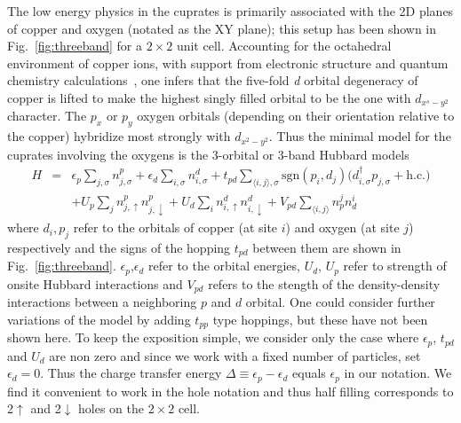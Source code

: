 The low energy physics in the cuprates is primarily associated with the 2D planes of copper and oxygen (notated 
as the XY plane); this setup has been shown in Fig.~\ref{fig:threeband} for a $2 \times 2$ unit cell.
Accounting for the octahedral environment of copper ions, with support from electronic structure 
and quantum chemistry calculations~\cite{Dagotto_sevModPhys}, one infers 
that the five-fold \emph{d} orbital degeneracy of copper is lifted to make the 
highest singly filled orbital to be the one with $d_{x^s-y^2}$ character. 
The $p_x$ or $p_y$ oxygen orbitals (depending on their orientation relative to the copper) 
hybridize most strongly with $d_{x^2-y^2}$. Thus the minimal model for the cuprates involving the oxygens 
is the 3-orbital or 3-band Hubbard models
\begin{eqnarray}
H &=&    \epsilon_p \sum_{j,\sigma} n^{p}_{j,\sigma} + \epsilon_{d} \sum_{i,\sigma}  n^{d}_{i,\sigma} 
	+ t_{pd} \sum_{\langle i,j \rangle, \sigma} \text{sgn}(p_i,d_j) \Big( d_{i,\sigma}^{\dagger} p_{j,\sigma} + \text{h.c.} \Big) \nonumber \\
  & &   + U_p \sum_{j} n^{p}_{j,\uparrow} n^{p}_{j,\downarrow} + U_d \sum_{i} n^{d}_{i,\uparrow} n^{d}_{i,\downarrow} + V_{pd} \sum_{\langle i,j \rangle} n^{j}_p n^{i}_d 
\end{eqnarray}
where $d_i,p_j$ refer to the orbitals of copper (at site $i$) and oxygen (at site $j$)  respectively 
and the signs of the hopping $t_{pd}$ between them are shown in Fig.~\ref{fig:threeband}. 
$\epsilon_p$,$\epsilon_d$ refer to the orbital energies, 
$U_d$, $U_p$ refer to strength of onsite Hubbard interactions and $V_{pd}$ refers to the 
stength of the density-density interactions between a neighboring $p$ and $d$ orbital. 
One could consider further variations of the model by adding $t_{pp}$ type hoppings, but 
these have not been shown here. To keep the exposition simple, we consider only 
the case where $\epsilon_p$, $t_{pd}$ and $U_{d}$ are non zero and 
since we work with a fixed number of particles, set $\epsilon_d = 0$. Thus the 
charge transfer energy $\Delta \equiv \epsilon_p - \epsilon_d$ equals $\epsilon_p$ in our notation. 
We find it convenient to work in the hole notation and thus half filling corresponds to 2$\uparrow$ and 2$\downarrow$ 
holes on the $2\times2$ cell.

